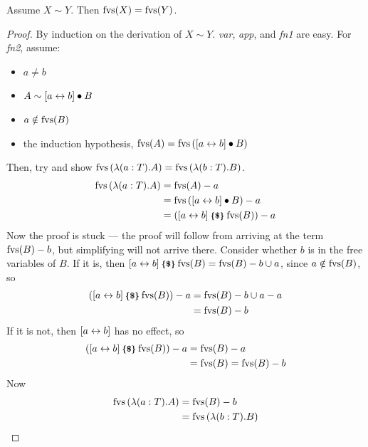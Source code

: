 \begin{lemma}
Assume \(X \sim Y\).
Then \(\mathrm{fvs}(X) = \mathrm{fvs}(Y)\).
\end{lemma}
\begin{proof}
By induction on the derivation of \(X \sim Y\).
\emph{var}, \emph{app}, and \emph{fn1} are easy.
For \emph{fn2}, assume:
\begin{itemize}
\item
\(a \neq b\)
\item
\(A \sim [a \leftrightarrow b] \bullet B\)
\item
\(a \notin \mathrm{fvs}(B)\)
\item
the induction hypothesis, \(\mathrm{fvs}(A) = \mathrm{fvs}\left([a \leftrightarrow b] \bullet B\right)\)
\end{itemize}
Then, try and show \(\mathrm{fvs}\left(\lambda (a:T).A\right) = \mathrm{fvs}\left(\lambda (b:T).B\right)\).
\begin{align*}
\mathrm{fvs}\left(\lambda (a:T).A\right)
&= \mathrm{fvs}(A) - a\\
&= \mathrm{fvs}\left([a \leftrightarrow b] \bullet B\right) - a\\
&= \left([a \leftrightarrow b] \mathbin{\textrm{\footnotesize{\textbf{\{\$\}}}}} \mathrm{fvs}(B)\right) - a\\
\end{align*}
Now the proof is stuck --- the proof will follow from arriving at the term \(\mathrm{fvs}(B) - b\), but simplifying will not arrive there.
Consider whether \(b\) is in the free variables of \(B\).
If it is, then \([a \leftrightarrow b] \mathbin{\textrm{\footnotesize{\textbf{\{\$\}}}}} \mathrm{fvs}(B) = \mathrm{fvs}(B) - {b} \cup {a}\), since \(a \notin \mathrm{fvs}(B)\), so
\begin{align*}
\left([a \leftrightarrow b] \mathbin{\textrm{\footnotesize{\textbf{\{\$\}}}}} \mathrm{fvs}(B)\right) - a
&= \mathrm{fvs}(B) - {b} \cup {a} - a\\
&= \mathrm{fvs}(B) - b
\end{align*}
If it is not, then \([a \leftrightarrow b]\) has no effect, so
\begin{align*}
\left([a \leftrightarrow b] \mathbin{\textrm{\footnotesize{\textbf{\{\$\}}}}} \mathrm{fvs}(B)\right) - a
&= \mathrm{fvs}(B) - a\\
&= \mathrm{fvs}(B) = \mathrm{fvs}(B) - b
\end{align*}
Now
\begin{align*}
\mathrm{fvs}\left(\lambda (a:T).A\right)
&= \mathrm{fvs}(B) - b\\
&= \mathrm{fvs}\left(\lambda (b:T).B\right)
\end{align*}
\end{proof}

